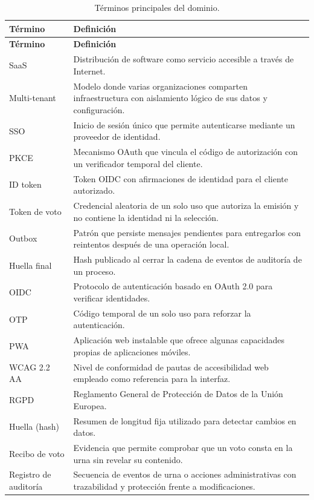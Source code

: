 \begin{longtable}{|p{}|p{}|}
\caption{Términos principales del dominio.}\label{tab:glosario}\\
\hline
\textbf{Término} & \textbf{Definición} \\
\hline
\endfirsthead
\hline
\textbf{Término} & \textbf{Definición} \\
\hline
\endhead
SaaS & Distribución de software como servicio accesible a través de Internet. \\
\hline
Multi-tenant & Modelo donde varias organizaciones comparten infraestructura con aislamiento lógico de sus datos y configuración. \\
\hline
SSO & Inicio de sesión único que permite autenticarse mediante un proveedor de identidad. \\
\hline
PKCE & Mecanismo OAuth que vincula el código de autorización con un verificador temporal del cliente. \\
\hline
ID token & Token OIDC con afirmaciones de identidad para el cliente autorizado. \\
\hline
Token de voto & Credencial aleatoria de un solo uso que autoriza la emisión y no contiene la identidad ni la selección. \\
\hline
Outbox & Patrón que persiste mensajes pendientes para entregarlos con reintentos después de una operación local. \\
\hline
Huella final & Hash publicado al cerrar la cadena de eventos de auditoría de un proceso. \\
\hline
OIDC & Protocolo de autenticación basado en OAuth 2.0 para verificar identidades. \\
\hline
OTP & Código temporal de un solo uso para reforzar la autenticación. \\
\hline
PWA & Aplicación web instalable que ofrece algunas capacidades propias de aplicaciones móviles. \\
\hline
WCAG 2.2 AA & Nivel de conformidad de pautas de accesibilidad web empleado como referencia para la interfaz. \\
\hline
RGPD & Reglamento General de Protección de Datos de la Unión Europea. \\
\hline
Huella (hash) & Resumen de longitud fija utilizado para detectar cambios en datos. \\
\hline
Recibo de voto & Evidencia que permite comprobar que un voto consta en la urna sin revelar su contenido. \\
\hline
Registro de auditoría & Secuencia de eventos de urna o acciones administrativas con trazabilidad y protección frente a modificaciones. \\
\hline
\end{longtable}


